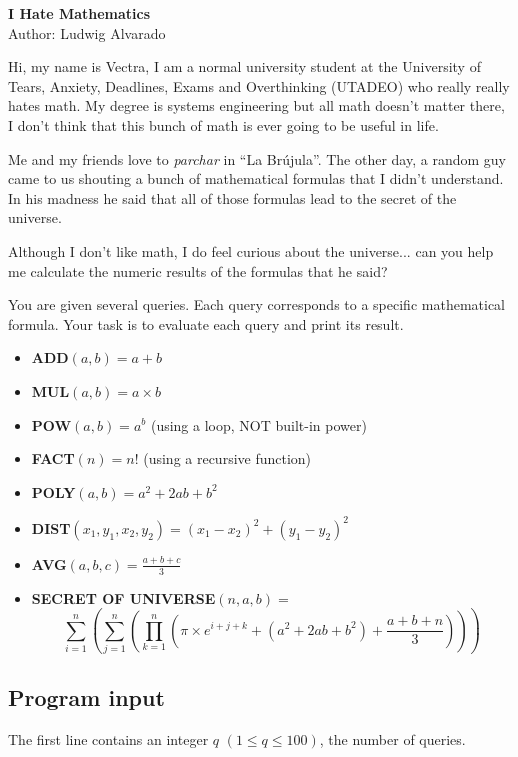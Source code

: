\documentclass[11pt,a4paper]{article}
\begin{document}
\begin{center}
  {\LARGE \bf I Hate Mathematics}\\[1ex]
  Author: Ludwig Alvarado
\end{center}

Hi, my name is Vectra, I am a normal university student at the University of Tears, Anxiety, Deadlines, Exams and Overthinking (UTADEO) who really really hates math. My degree is systems engineering but all math doesn't matter there, I don't think that this bunch of math is ever going to be useful in life.

Me and my friends love to \textit{parchar} in ``La Brújula''. The other day, a random guy came to us shouting a bunch of mathematical formulas that I didn't understand. In his madness he said that all of those formulas lead to the secret of the universe.

Although I don't like math, I do feel curious about the universe... can you help me calculate the numeric results of the formulas that he said?

You are given several queries. Each query corresponds to a specific mathematical formula. Your task is to evaluate each query and print its result.


\begin{itemize}
  \item \textbf{ADD}$(a,b) = a + b$
  \item \textbf{MUL}$(a,b) = a \times b$
  \item \textbf{POW}$(a,b) = a^b$ (using a loop, NOT built-in power)
  \item \textbf{FACT}$(n) = n!$ (using a recursive function)
  \item \textbf{POLY}$(a,b) = a^2 + 2ab + b^2$
  \item \textbf{DIST}$(x_1,y_1,x_2,y_2) = (x_1 - x_2)^2 + (y_1 - y_2)^2$
  \item \textbf{AVG}\( (a,b,c) =  \frac{a+b+c}{3}\) 
  \item \textbf{SECRET OF UNIVERSE}\((n,a,b) =\)
        \[
\sum_{i=1}^{n}
\left(
\sum_{j=1}^{n}
\left(
\prod_{k=1}^{n}
\left(\pi \times e^{i + j +k} +  (a^2 + 2ab + b^2) + \frac{a + b + n}{3} \right)
\right)
\right)
\]
\end{itemize}


\subsection*{Program input}

The first line contains an integer \(q\) \((1 \leq q \leq 100)\), the number of queries.
\end{document}
